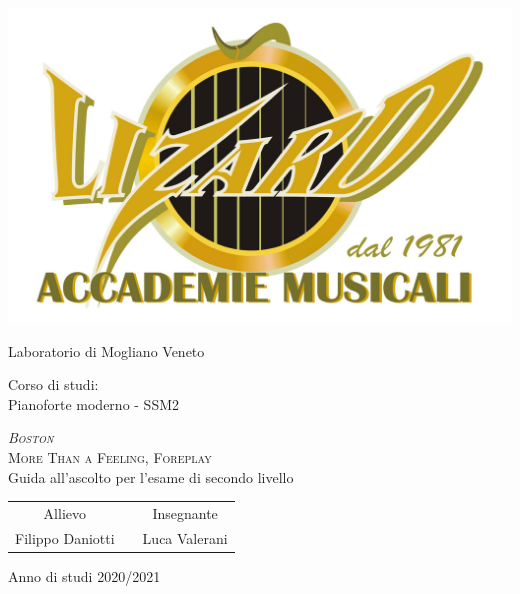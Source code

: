 \documentclass[class=book, crop=false, oneside]{standalone}
\begin{document}
	\begin{titlepage}
		\centering
		\includegraphics[width=.72\textwidth, keepaspectratio]{logo-lizard1}
		
		\vspace{1.2cm}
		\LARGE{Laboratorio di Mogliano Veneto\\}
		
		\vspace{1cm}
		\Large{Corso di studi:\\ Pianoforte moderno - SSM2}
		
		\vspace{0.7cm}
		\Huge\textsc{\textit{Boston}\\}
		\vspace{0.3cm}
		\huge{\textsc{More Than a Feeling, Foreplay\\}}
		\vspace{.5cm}
		\large{Guida all'ascolto per l'esame di secondo livello\\}
		
		\vspace{1.5cm}
		\begin{tabularx}{\textwidth}{cXc}
		\Large{Allievo}          &  & \Large{Insegnante}    \\
		\cmidrule(lr){1-1} \cmidrule(lr){3-3}
		\large{Filippo Daniotti} &  & \large{Luca Valerani} \\
		\end{tabularx}
		
		\vspace{1.5cm}
		\LARGE{Anno di studi 2020/2021}
	\end{titlepage}
   
\end{document}
